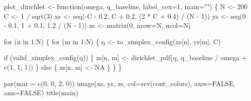 \documentclass[
  letterpaper,
  DIV=11,
  numbers=noendperiod]{scrartcl}
\newenvironment{Shaded}{\begin{snugshade}}{\end{snugshade}}
\newcommand{\AttributeTok}[1]{\textcolor[rgb]{0.40,0.45,0.13}{#1}}
\newcommand{\ConstantTok}[1]{\textcolor[rgb]{0.56,0.35,0.01}{#1}}
\newcommand{\ControlFlowTok}[1]{\textcolor[rgb]{0.00,0.23,0.31}{#1}}
\newcommand{\DecValTok}[1]{\textcolor[rgb]{0.68,0.00,0.00}{#1}}
\newcommand{\FloatTok}[1]{\textcolor[rgb]{0.68,0.00,0.00}{#1}}
\newcommand{\FunctionTok}[1]{\textcolor[rgb]{0.28,0.35,0.67}{#1}}
\newcommand{\NormalTok}[1]{\textcolor[rgb]{0.00,0.23,0.31}{#1}}
\newcommand{\OtherTok}[1]{\textcolor[rgb]{0.00,0.23,0.31}{#1}}
\newcommand{\SpecialCharTok}[1]{\textcolor[rgb]{0.37,0.37,0.37}{#1}}
\newcommand{\StringTok}[1]{\textcolor[rgb]{0.13,0.47,0.30}{#1}}
\begin{document}
\begin{Shaded}
\begin{Highlighting}[]
\NormalTok{plot\_dirichlet }\OtherTok{\textless{}{-}} \ControlFlowTok{function}\NormalTok{(omega, q\_baseline, }\AttributeTok{label\_cex=}\DecValTok{1}\NormalTok{, }\AttributeTok{main=}\StringTok{""}\NormalTok{) \{}
\NormalTok{  N }\OtherTok{\textless{}{-}} \DecValTok{200}
\NormalTok{  C }\OtherTok{\textless{}{-}} \DecValTok{1} \SpecialCharTok{/} \FunctionTok{sqrt}\NormalTok{(}\DecValTok{3}\NormalTok{)}
\NormalTok{  xs }\OtherTok{\textless{}{-}} \FunctionTok{seq}\NormalTok{(}\SpecialCharTok{{-}}\NormalTok{C }\SpecialCharTok{{-}} \FloatTok{0.2}\NormalTok{, C }\SpecialCharTok{+} \FloatTok{0.2}\NormalTok{, (}\DecValTok{2} \SpecialCharTok{*}\NormalTok{ C }\SpecialCharTok{+} \FloatTok{0.4}\NormalTok{) }\SpecialCharTok{/}\NormalTok{ (N }\SpecialCharTok{{-}} \DecValTok{1}\NormalTok{))}
\NormalTok{  ys }\OtherTok{\textless{}{-}} \FunctionTok{seq}\NormalTok{(}\DecValTok{0} \SpecialCharTok{{-}} \FloatTok{0.1}\NormalTok{, }\DecValTok{1} \SpecialCharTok{+} \FloatTok{0.1}\NormalTok{, }\FloatTok{1.2} \SpecialCharTok{/}\NormalTok{ (N }\SpecialCharTok{{-}} \DecValTok{1}\NormalTok{))}
\NormalTok{  zs }\OtherTok{\textless{}{-}} \FunctionTok{matrix}\NormalTok{(}\DecValTok{0}\NormalTok{, }\AttributeTok{nrow=}\NormalTok{N, }\AttributeTok{ncol=}\NormalTok{N)}

  \ControlFlowTok{for}\NormalTok{ (n }\ControlFlowTok{in} \DecValTok{1}\SpecialCharTok{:}\NormalTok{N) \{}
    \ControlFlowTok{for}\NormalTok{ (m }\ControlFlowTok{in} \DecValTok{1}\SpecialCharTok{:}\NormalTok{N) \{}
\NormalTok{      q }\OtherTok{\textless{}{-}} \FunctionTok{to\_simplex\_config}\NormalTok{(xs[n], ys[m], C)}

      \ControlFlowTok{if}\NormalTok{ (}\FunctionTok{valid\_simplex\_config}\NormalTok{(q)) \{}
\NormalTok{        zs[n, m] }\OtherTok{\textless{}{-}} \FunctionTok{dirichlet\_pdf}\NormalTok{(q, q\_baseline }\SpecialCharTok{/}\NormalTok{ omega }\SpecialCharTok{+} \FunctionTok{c}\NormalTok{(}\DecValTok{1}\NormalTok{, }\DecValTok{1}\NormalTok{, }\DecValTok{1}\NormalTok{))}
\NormalTok{      \} }\ControlFlowTok{else}\NormalTok{ \{}
\NormalTok{        zs[n, m] }\OtherTok{\textless{}{-}} \ConstantTok{NA}
\NormalTok{      \}}
\NormalTok{    \}}
\NormalTok{  \}}

  \FunctionTok{par}\NormalTok{(}\AttributeTok{mar =} \FunctionTok{c}\NormalTok{(}\DecValTok{0}\NormalTok{, }\DecValTok{0}\NormalTok{, }\DecValTok{2}\NormalTok{, }\DecValTok{0}\NormalTok{))}
  \FunctionTok{image}\NormalTok{(xs, ys, zs, }\AttributeTok{col=}\FunctionTok{rev}\NormalTok{(cont\_colors), }\AttributeTok{axes=}\ConstantTok{FALSE}\NormalTok{, }\AttributeTok{ann=}\ConstantTok{FALSE}\NormalTok{)}
  \FunctionTok{title}\NormalTok{(main)}


\end{Highlighting}
\end{Shaded}
\end{document}
